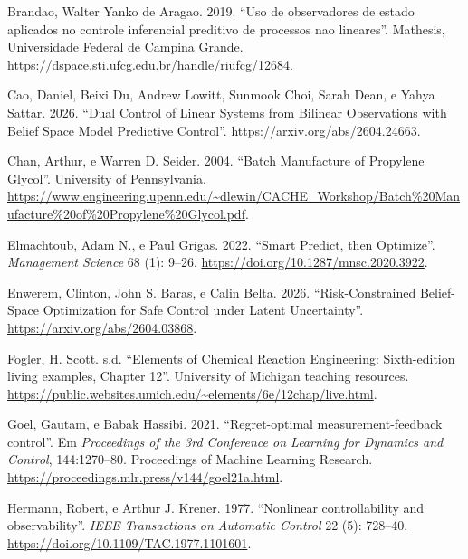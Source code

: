 \documentclass[
  11pt,
]{article}
\newlength{\cslhangindent}
\newlength{\cslentryspacingunit} %
\newenvironment{CSLReferences}[2] %
 {%
  \setlength{\parindent}{0pt}
  \ifodd #1
  \let\oldpar\par
  \def\par{\hangindent=\cslhangindent\oldpar}
  \fi
  \setlength{\parskip}{#2\cslentryspacingunit}
 }%
 {}
\begin{document}
\hypertarget{refs}{}
\begin{CSLReferences}{1}{0}
\leavevmode{}%
Brandao, Walter Yanko de Aragao. 2019. {``Uso de observadores de estado
aplicados no controle inferencial preditivo de processos nao
lineares''}. Mathesis, Universidade Federal de Campina Grande.
\url{https://dspace.sti.ufcg.edu.br/handle/riufcg/12684}.

\leavevmode{}%
Cao, Daniel, Beixi Du, Andrew Lowitt, Sunmook Choi, Sarah Dean, e Yahya
Sattar. 2026. {``Dual Control of Linear Systems from Bilinear
Observations with Belief Space Model Predictive Control''}.
\url{https://arxiv.org/abs/2604.24663}.

\leavevmode{}%
Chan, Arthur, e Warren D. Seider. 2004. {``Batch Manufacture of
Propylene Glycol''}. University of Pennsylvania.
\url{https://www.engineering.upenn.edu/~dlewin/CACHE_Workshop/Batch\%20Manufacture\%20of\%20Propylene\%20Glycol.pdf}.

\leavevmode{}%
Elmachtoub, Adam N., e Paul Grigas. 2022. {``Smart {Predict, then
Optimize}''}. \emph{Management Science} 68 (1): 9--26.
\url{https://doi.org/10.1287/mnsc.2020.3922}.

\leavevmode{}%
Enwerem, Clinton, John S. Baras, e Calin Belta. 2026.
{``Risk-Constrained Belief-Space Optimization for Safe Control under
Latent Uncertainty''}. \url{https://arxiv.org/abs/2604.03868}.

\leavevmode{}%
Fogler, H. Scott. s.d. {``Elements of Chemical Reaction Engineering:
Sixth-edition living examples, Chapter 12''}. University of Michigan
teaching resources.
\url{https://public.websites.umich.edu/~elements/6e/12chap/live.html}.

\leavevmode{}%
Goel, Gautam, e Babak Hassibi. 2021. {``Regret-optimal
measurement-feedback control''}. Em \emph{Proceedings of the 3rd
Conference on Learning for Dynamics and Control}, 144:1270--80.
Proceedings of Machine Learning Research.
\url{https://proceedings.mlr.press/v144/goel21a.html}.

\leavevmode{}%
Hermann, Robert, e Arthur J. Krener. 1977. {``Nonlinear controllability
and observability''}. \emph{IEEE Transactions on Automatic Control} 22
(5): 728--40. \url{https://doi.org/10.1109/TAC.1977.1101601}.


\end{CSLReferences}
\end{document}
